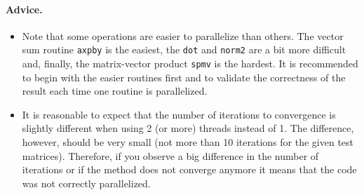 \documentclass{article}
\begin{document}
\paragraph{Advice.}
\begin{itemize}
\item Note that some operations are easier to parallelize than
  others. The vector sum routine \texttt{axpby} is the easiest, the
  \texttt{dot} and \texttt{norm2} are a bit more difficult and,
  finally, the matrix-vector product \texttt{spmv} is the hardest. It
  is recommended to begin with the easier routines first and to
  validate the correctness of the result each time one routine is
  parallelized.
\item It is reasonable to expect that the number of iterations to
  convergence is slightly different when using 2 (or more) threads
  instead of 1. The difference, however, should be very small (not
  more than 10 iterations for the given test matrices). Therefore, if
  you observe a big difference in the number of iterations or if the
  method does not converge anymore it means that the code was not
  correctly parallelized.
\end{itemize}
\end{document}
